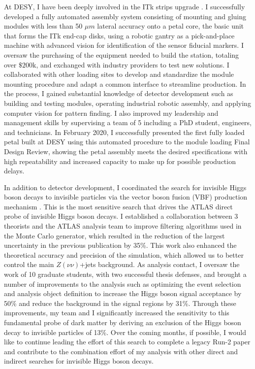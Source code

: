 \documentclass[a4paper]{article}
\begin{document}
At DESY, I have been deeply involved in the ITk strips upgrade \cite{ITKstrips}. I successfully developed a fully automated assembly system consisting of mounting and gluing modules with less than 50 $\mu m$ lateral accuracy onto a petal core, the basic unit that forms the ITk end-cap disks, using a robotic gantry as a pick-and-place machine with advanced vision for identification of the sensor fiducial markers. I oversaw the purchasing of the equipment needed to build the station, totaling over $\$200$k, and exchanged with industry providers to test new solutions. I collaborated with other loading sites to develop and standardize the module mounting procedure and adapt a common interface to streamline production. In the process, I gained substantial knowledge of detector development such as building and testing modules, operating industrial robotic assembly, and applying computer vision for pattern finding. I also improved my leadership and management skills by supervising a team of 5 including a PhD student, engineers, and technicians. In February 2020, I successfully presented the first fully loaded petal built at DESY using this automated procedure to the module loading Final Design Review, showing the petal assembly meets the desired specifications with high repeatability and increased capacity to make up for possible production delays.

\bigskip

In addition to detector development, I coordinated the search for invisible Higgs boson decays to invisible particles via the vector boson fusion (VBF) production mechanism  \cite{vbfMET_CONF2020}. This is the most sensitive search that drives the ATLAS direct probe of invisible Higgs boson decays.
I established a collaboration between 3 theorists and the ATLAS analysis team to improve filtering algorithms used in the Monte Carlo generator, which resulted in the reduction of the largest uncertainty in the previous publication by 35\%. This work also enhanced the theoretical accuracy and precision of the simulation, which allowed us to better control the main $Z\left(\nu\nu\right)$+jets background. As analysis contact, I oversaw the work of 10 graduate students, with two successful thesis defenses, and brought a number of improvements to the analysis such as optimizing the event selection and analysis object definition to increase the Higgs boson signal acceptance by 50\% and reduce the background in the signal regions by 31\%. Through these improvements, my team and I significantly increased the sensitivity to this fundamental probe of dark matter by deriving an exclusion of the Higgs boson decay to invisible particles of 13\%. Over the coming months, if possible, I would like to continue leading the effort of this search to complete a legacy Run-2 paper and contribute to the combination effort of my analysis with other direct and indirect searches for invisible Higgs boson decays.
\end{document}
